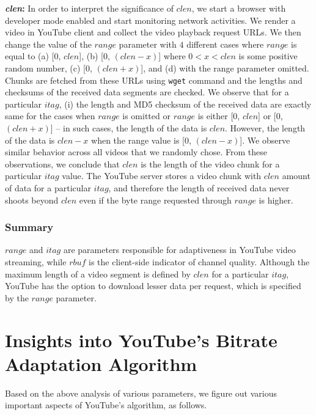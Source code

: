 {\bf {\em clen}:} In order to interpret the significance of $clen$, we start a browser with developer mode enabled and start monitoring network activities.
We render a video in YouTube client and collect the video playback request \acp{URL}.
We then change the value of the $range$ parameter with $4$ different cases where $range$ is equal to (a) [$0$, $clen$],  (b) [$0$, $(clen-x)$] where $0<x<clen$ is some positive random number, (c) [$0$, $(clen+x)$], and (d) with the range parameter omitted.
Chunks are fetched from these \acp{URL} using \texttt{wget} command and the lengths and  checksums of the received data segments are checked.
We observe that for a particular $itag$, (i) the length and MD5 checksum of the received data are exactly same for the cases when  $range$ is omitted or $range$ is either [$0$, $clen$] or [$0$, $(clen+x)$] -- in such cases, the length of the data is $clen$.
However, the length of the data is $clen-x$ when the range value is [$0$, $(clen-x)$].
We observe similar behavior across all videos that we randomly chose.
From these observations, we conclude that $clen$ is the length of the video chunk for a particular $itag$ value.
The YouTube server stores a video chunk with $clen$ amount of data for a particular $itag$, and therefore the length of received data never shoots beyond $clen$ even if the byte range requested through $range$ is higher.

\subsubsection{Summary} $range$ and $itag$ are parameters responsible for adaptiveness in YouTube video streaming, while $rbuf$ is the client-side indicator of channel quality.
Although the maximum length of a video segment is defined by $clen$ for a particular $itag$, YouTube has the option to download lesser data per request, which is specified by the $range$ parameter.

\section{Insights into YouTube's Bitrate Adaptation Algorithm}
\label{chap03s1:subsec:seglength}
Based on the above analysis of various parameters, we figure out various important aspects of YouTube's  algorithm, as follows.

